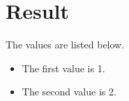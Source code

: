 \section{Result}
\label{sec:result}
The values are listed below.
\begin{itemize}
    \item The first value is 1.   
\item The second value is 2.
\end{itemize}
